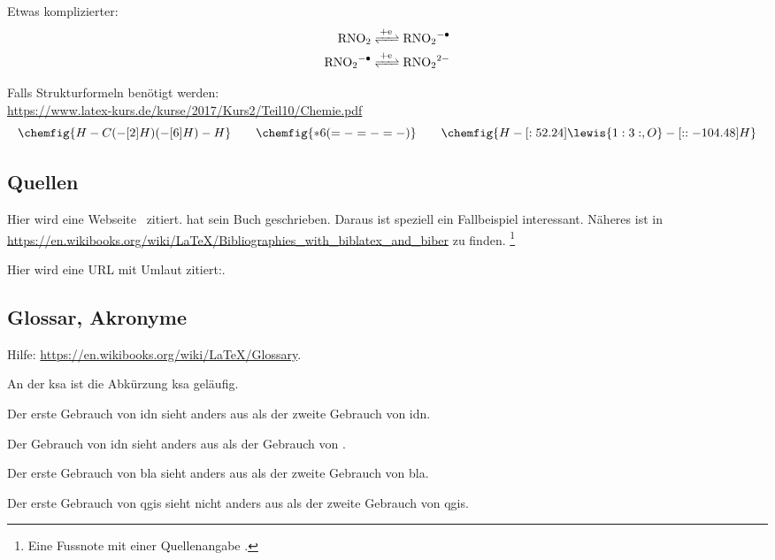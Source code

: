 Etwas komplizierter:
\begin{align*}
  \ce{RNO2 &<=>[+e] RNO2^{-.} \\
       RNO2^{-.} &<=>[+e] RNO2^2-}
\end{align*}

Falls Strukturformeln benötigt werden:\\
\url{https://www.latex-kurs.de/kurse/2017/Kurs2/Teil10/Chemie.pdf}
\begin{equation}
\chemfig{H-C(-[2]H)(-[6]H)-H} \quad\quad \chemfig{*6(=-=-=-)} \quad\quad \chemfig{H-[:52.24]\lewis{1:3:,O}-[::-104.48]H}
\end{equation}

\subsection*{Quellen}

Hier wird eine Webseite~\parencite{maKSA} zitiert. \cite{Theis2014} hat sein Buch geschrieben. Daraus ist speziell ein Fallbeispiel \cite[siehe][Seite 32]{Theis2014} interessant. Näheres ist in \url{https://en.wikibooks.org/wiki/LaTeX/Bibliographies_with_biblatex_and_biber} zu finden. \footnote{Eine Fussnote mit einer Quellenangabe \parencite[siehe][Seite 32]{Theis2014}.}

Hier wird eine URL mit Umlaut zitiert:\cite{Gärtner}.

\subsection*{Glossar, Akronyme}
Hilfe: \url{https://en.wikibooks.org/wiki/LaTeX/Glossary}.

An der \Acrlong{ksa}  ist die Abkürzung  \acrshort{ksa} geläufig.


Der erste Gebrauch von \gls{idn} sieht anders aus als der zweite Gebrauch von \gls{idn}. 

Der Gebrauch von \acrshort{idn} sieht anders aus als der  Gebrauch von . 

Der erste Gebrauch von \gls{bla} sieht anders aus als der zweite Gebrauch von \gls{bla}. 

Der erste Gebrauch von \gls{qgis} sieht nicht anders aus als der zweite Gebrauch von \gls{qgis}. 

